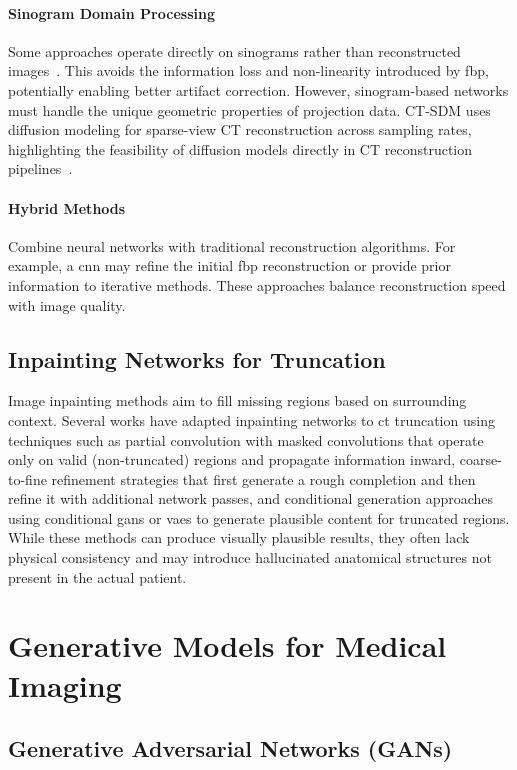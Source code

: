 \paragraph{Sinogram Domain Processing} Some approaches operate directly on sinograms rather than reconstructed images~\cite{jin2017deep}. This avoids the information loss and non-linearity introduced by \gls{fbp}, potentially enabling better artifact correction. However, sinogram-based networks must handle the unique geometric properties of projection data. CT-SDM uses diffusion modeling for sparse-view CT reconstruction across sampling rates, highlighting the feasibility of diffusion models directly in CT reconstruction pipelines~\cite{yang2025ctsdm}.

\paragraph{Hybrid Methods} Combine neural networks with traditional reconstruction algorithms. For example, a \gls{cnn} may refine the initial \gls{fbp} reconstruction or provide prior information to iterative methods. These approaches balance reconstruction speed with image quality.

\subsection{Inpainting Networks for Truncation}

Image inpainting methods aim to fill missing regions based on surrounding context. Several works have adapted inpainting networks to \gls{ct} truncation using techniques such as partial convolution with masked convolutions that operate only on valid (non-truncated) regions and propagate information inward, coarse-to-fine refinement strategies that first generate a rough completion and then refine it with additional network passes, and conditional generation approaches using conditional \glspl{gan} or \glspl{vae} to generate plausible content for truncated regions. While these methods can produce visually plausible results, they often lack physical consistency and may introduce hallucinated anatomical structures not present in the actual patient.

\section{Generative Models for Medical Imaging}

\subsection{Generative Adversarial Networks (GANs)}

